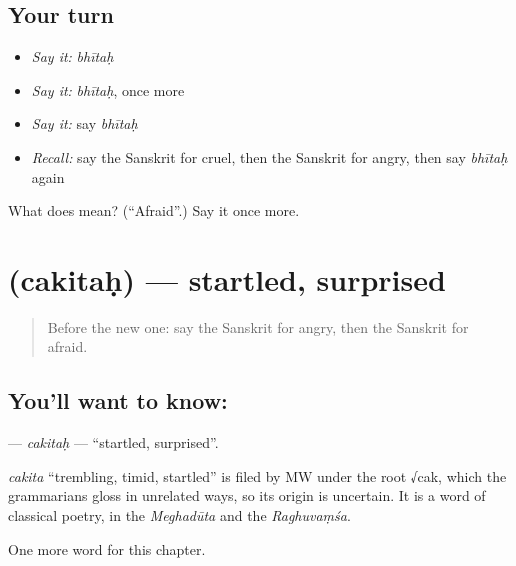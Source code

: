 \subsection*{Your turn}
\begin{itemize}
\raggedright
  \item \emph{Say it:} \emph{bhītaḥ}
  \item \emph{Say it:} \emph{bhītaḥ}, once more
  \item \emph{Say it:} say \emph{bhītaḥ}
  \item \emph{Recall:} say the Sanskrit for cruel, then the Sanskrit for angry, then say \emph{bhītaḥ} again
\end{itemize}

\begin{tcolorbox}[breakable,colback=teal!4,colframe=teal!35!black,title={Before you move on}]
What does  mean? (\textquotedblleft{}Afraid\textquotedblright{}.) Say it once more.
\end{tcolorbox}
\section[\texorpdfstring{\sk{चकितः} (cakitaḥ)}{चकितः (cakitaḥ)}]{ (cakitaḥ) — startled, surprised}

\label{lesson:SA-C157-cakitah}



\begin{quote}
Before the new one: say the Sanskrit for angry, then the Sanskrit for afraid.
\end{quote}

\subsection*{You'll want to know: }
\textbf{} — \emph{cakitaḥ} — \textquotedblleft{}startled, surprised\textquotedblright{}.

\begin{cousinweb}
\emph{cakita} \textquotedblleft{}trembling, timid, startled\textquotedblright{} is filed by MW under the root √cak, which the grammarians gloss in unrelated ways, so its origin is uncertain. It is a word of classical poetry, in the \emph{Meghadūta} and the \emph{Raghuvaṃśa}.
\end{cousinweb}

\begin{grammarlens}[title={What you've built}]
One more word for this chapter.
\end{grammarlens}

